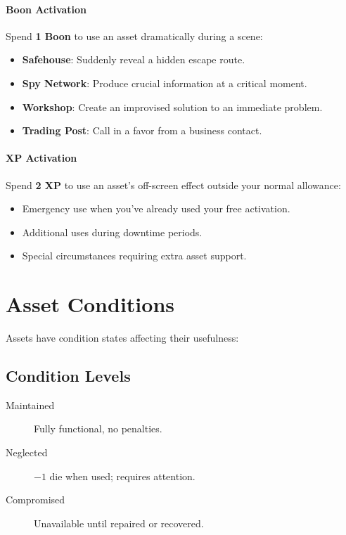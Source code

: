 \paragraph{Boon Activation}
Spend \textbf{1 Boon} to use an asset dramatically during a scene:
\begin{itemize}
\item \textbf{Safehouse}: Suddenly reveal a hidden escape route.
\item \textbf{Spy Network}: Produce crucial information at a critical moment.
\item \textbf{Workshop}: Create an improvised solution to an immediate problem.
\item \textbf{Trading Post}: Call in a favor from a business contact.
\end{itemize}

\paragraph{XP Activation}
Spend \textbf{2 XP} to use an asset's off-screen effect outside your normal allowance:
\begin{itemize}
\item Emergency use when you've already used your free activation.
\item Additional uses during downtime periods.
\item Special circumstances requiring extra asset support.
\end{itemize}

\section{Asset Conditions}

Assets have condition states affecting their usefulness:

\subsection*{Condition Levels}
\begin{description}
\item[Maintained] Fully functional, no penalties.
\item[Neglected] $-1$ die when used; requires attention.
\item[Compromised] Unavailable until repaired or recovered.
\end{description}

